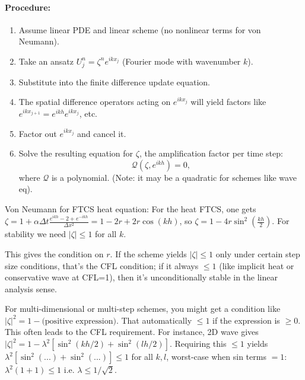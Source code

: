 \documentclass[a4paper,11pt]{article}
\begin{document}
\paragraph{Procedure:}
\begin{enumerate}
    \item Assume linear PDE and linear scheme (no nonlinear terms for von Neumann).

    \item Take an ansatz $U_{j}^n = \zeta^n e^{i k x_j}$ (Fourier mode with wavenumber $k$).

    \item Substitute into the finite difference update equation.

    \item The spatial difference operators acting on $e^{i k x_j}$ will yield factors like $e^{i k x_{j+1}} = e^{i k h}e^{i k x_j}$, etc.

    \item Factor out $e^{i k x_j}$ and cancel it.

    \item Solve the resulting equation for $\zeta$, the amplification factor per time step:
          $$\mathcal{Q}(\zeta, e^{ik h}) = 0,$$
          where $\mathcal{Q}$ is a polynomial. (Note: it may be a quadratic for schemes like wave eq).
\end{enumerate}

\begin{example}{Von Neumann for FTCS heat equation:}
    For the heat FTCS, one gets $\zeta = 1 + \alpha \Delta t \frac{e^{i k h} - 2 + e^{-i k h}}{\Delta x^2} = 1 - 2r + 2r\cos(kh)$, so $\zeta = 1 - 4r\sin^2(\frac{k h}{2})$. For stability we need $|\zeta| \le 1$ for all $k$.

    This gives the condition on $r$. If the scheme yields $|\zeta| \le 1$ only under certain step size conditions, that's the CFL condition; if it always $\le1$ (like implicit heat or conservative wave at CFL=1), then it's unconditionally stable in the linear analysis sense.

\end{example}

For multi-dimensional or multi-step schemes, you might get a condition like $|\zeta|^2 = 1 - \text{(positive expression)}$. That automatically $\le1$ if the expression is $\ge0$. This often leads to the CFL requirement. For instance, 2D wave gives $|\zeta|^2 = 1 - \lambda^2[ \sin^2(kh/2)+\sin^2(lh/2) ]$. Requiring this $\le1$ yields $\lambda^2[ \sin^2(...)+\sin^2(...) ] \le 1$ for all $k,l$, worst-case when sin terms $=1$: $\lambda^2(1+1)\le1$ i.e. $\lambda \le 1/\sqrt{2}$.
\end{document}
